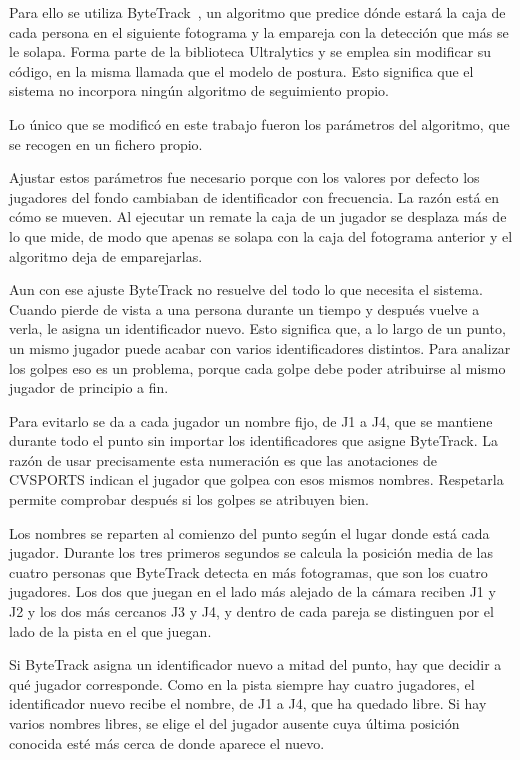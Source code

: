 Para ello se utiliza ByteTrack~\cite{zhang2022bytetrack}, un algoritmo que predice dónde estará la caja de cada persona en el siguiente fotograma y la empareja con la detección que más se le solapa.
Forma parte de la biblioteca Ultralytics y se emplea sin modificar su código, en la misma llamada que el modelo de postura.
Esto significa que el sistema no incorpora ningún algoritmo de seguimiento propio.

Lo único que se modificó en este trabajo fueron los parámetros del algoritmo, que se recogen en un fichero propio.

Ajustar estos parámetros fue necesario porque con los valores por defecto los jugadores del fondo cambiaban de identificador con frecuencia.
La razón está en cómo se mueven.
Al ejecutar un remate la caja de un jugador se desplaza más de lo que mide, de modo que apenas se solapa con la caja del fotograma anterior y el algoritmo deja de emparejarlas.

Aun con ese ajuste ByteTrack no resuelve del todo lo que necesita el sistema.
Cuando pierde de vista a una persona durante un tiempo y después vuelve a verla, le asigna un identificador nuevo.
Esto significa que, a lo largo de un punto, un mismo jugador puede acabar con varios identificadores distintos.
Para analizar los golpes eso es un problema, porque cada golpe debe poder atribuirse al mismo jugador de principio a fin.

Para evitarlo se da a cada jugador un nombre fijo, de J1 a J4, que se mantiene durante todo el punto sin importar los identificadores que asigne ByteTrack.
La razón de usar precisamente esta numeración es que las anotaciones de CVSPORTS indican el jugador que golpea con esos mismos nombres.
Respetarla permite comprobar después si los golpes se atribuyen bien.

Los nombres se reparten al comienzo del punto según el lugar donde está cada jugador.
Durante los tres primeros segundos se calcula la posición media de las cuatro personas que ByteTrack detecta en más fotogramas, que son los cuatro jugadores.
Los dos que juegan en el lado más alejado de la cámara reciben J1 y J2 y los dos más cercanos J3 y J4, y dentro de cada pareja se distinguen por el lado de la pista en el que juegan.

Si ByteTrack asigna un identificador nuevo a mitad del punto, hay que decidir a qué jugador corresponde.
Como en la pista siempre hay cuatro jugadores, el identificador nuevo recibe el nombre, de J1 a J4, que ha quedado libre.
Si hay varios nombres libres, se elige el del jugador ausente cuya última posición conocida esté más cerca de donde aparece el nuevo.

